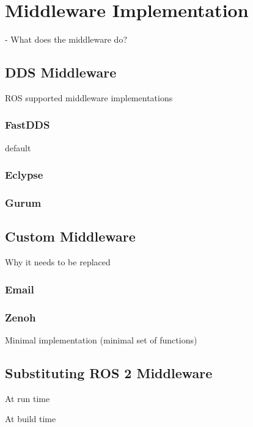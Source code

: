 \chapter{Middleware Implementation}


- What does the middleware do?



\section{DDS Middleware}

    ROS supported middleware implementations

    \subsection{FastDDS}

    default

    \subsection{Eclypse}

    \subsection{Gurum}

    


\section{Custom Middleware}

    Why it needs to be replaced

    \subsection{Email}

    \subsection{Zenoh}

    Minimal implementation (minimal set of functions)

    
\section{Substituting ROS 2 Middleware}

    At run time

    At build time

